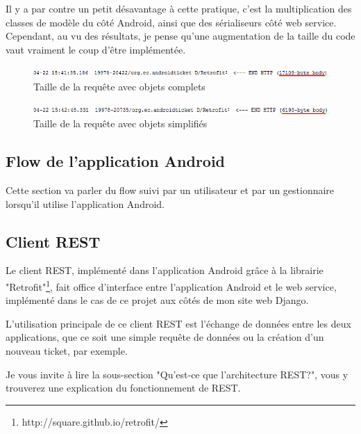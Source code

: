 \documentclass[12pt,table,a4paper]{report}
\begin{document}
Il y a par contre un petit désavantage à cette pratique, c'est la multiplication des classes de modèle du côté Android, ainsi que des sérialiseurs côté web service. Cependant, au vu des résultats, je pense qu'une augmentation de la taille du code vaut vraiment le coup d'être implémentée. 

\begin{figure}[t]
\centering
\includegraphics[width=1.0\textwidth]{images/screenshots/proofs/comparaison-rest-full-ticket.png}
\caption{Taille de la requête avec objets complets}
\label{fig:rest-full-ticket}
\end{figure}

\begin{figure}[t]
\centering
\includegraphics[width=1.0\textwidth]{images/screenshots/proofs/comparaison-rest-simple-ticket.png}
\caption{Taille de la requête avec objets simplifiés}
\label{fig:rest-simple-ticket}
\end{figure}

\subsection{Flow de l'application Android}
Cette section va parler du flow suivi par un utilisateur et par un gestionnaire lorsqu'il utilise l'application Android.



\subsection{Client REST}
Le client REST, implémenté dans l'application Android grâce à la librairie "Retrofit"\footnote{http://square.github.io/retrofit/}, fait office d'interface entre l'application Android et le web service, implémenté dans le cas de ce projet aux côtés de mon site web Django.

L'utilisation principale de ce client REST est l'échange de données entre les deux applications, que ce soit une simple requête de données ou la création d'un nouveau ticket, par exemple.

Je vous invite à lire la sous-section "Qu'est-ce que l'architecture REST?", vous y trouverez une explication du fonctionnement de REST.
\end{document}
